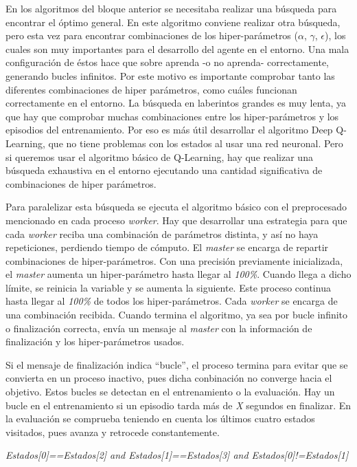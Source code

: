		
			
		En los algoritmos del bloque anterior se necesitaba realizar una búsqueda para encontrar el óptimo general. En este algoritmo conviene realizar otra búsqueda, pero esta vez para encontrar combinaciones de los hiper-parámetros ($\alpha$, $\gamma$, $\epsilon$), los cuales son muy importantes para el desarrollo del agente en el entorno. Una mala configuración de éstos hace que sobre aprenda -o no aprenda- correctamente, generando bucles infinitos. Por este motivo es importante comprobar tanto las diferentes combinaciones de hiper parámetros, como cuáles funcionan correctamente en el entorno. La búsqueda en laberintos grandes es muy lenta, ya que hay que comprobar muchas combinaciones entre los hiper-parámetros y los episodios del entrenamiento. Por eso es más útil desarrollar el algoritmo Deep Q-Learning, que no tiene problemas con los estados al usar una red neuronal. Pero si queremos usar el algoritmo básico de Q-Learning, hay que realizar una búsqueda exhaustiva en el entorno ejecutando una cantidad significativa de combinaciones de hiper parámetros.

		Para paralelizar esta búsqueda se ejecuta el algoritmo básico con el preprocesado mencionado en cada proceso \textit{worker}. Hay que desarrollar una estrategia para que cada \textit{worker} reciba una combinación de parámetros distinta, y así no haya repeticiones, perdiendo tiempo de cómputo. El \textit{master} se encarga de repartir combinaciones de hiper-parámetros. Con una precisión previamente inicializada, el \textit{master} aumenta un hiper-parámetro hasta llegar al \textit{100\%}. Cuando llega a dicho límite, se reinicia la variable y se aumenta la siguiente. Este proceso continua hasta llegar al \textit{100\%} de todos los hiper-parámetros. Cada \textit{worker} se encarga de una combinación recibida. Cuando termina el algoritmo, ya sea por bucle infinito o finalización correcta, envía un mensaje al \textit{master} con la información de finalización y los hiper-parámetros usados.
		
		Si el mensaje de finalización indica ``bucle'', el proceso termina para evitar que se convierta en un proceso inactivo, pues dicha conbinación no converge hacia el objetivo. Estos bucles se detectan en el entrenamiento o la evaluación. Hay un bucle en el entrenamiento si un episodio tarda más de \textit{X} segundos en finalizar. En la evaluación se comprueba teniendo en cuenta los últimos cuatro estados visitados, pues avanza y retrocede constantemente. 
		\begin{center}
			\textit{Estados[0]==Estados[2] and Estados[1]==Estados[3] and Estados[0]!=Estados[1] }
		\end{center}
		
